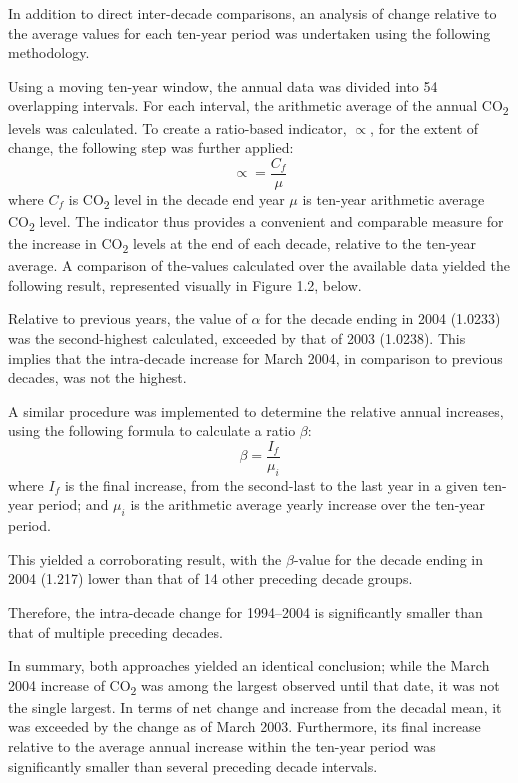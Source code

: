 \documentclass[12pt]{mcmthesis}
\newcommand{\size}[2]{{\fontsize{#1}{0}\selectfont#2}}
\begin{document}
    \noindent\size{12}{\textbf{Comparing to moving averages}}

    In addition to direct inter-decade comparisons, an analysis of change relative to the average values for each ten-year period was undertaken using the following methodology.

    Using a moving ten-year window, the annual data was divided into 54 overlapping intervals.
    For each interval, the arithmetic average of the annual CO\textsubscript{2} levels was calculated.
    To create a ratio-based indicator, $\propto$, for the extent of change, the following step was further applied:
%
    \begin{equation}
        \propto = \frac{C_f}{\mu}
    \end{equation}
%
    where
    $C_f$ is CO\textsubscript{2} level in the decade end year
    $\mu$ is ten-year arithmetic average CO\textsubscript{2} level.
    The indicator thus provides a convenient and comparable measure for the increase in CO\textsubscript{2} levels at the end of each decade, relative to the ten-year average. A comparison of the-values calculated over the available data yielded the following result, represented visually in Figure 1.2, below.


    Relative to previous years, the value of $\alpha$ for the decade ending in 2004 (1.0233) was the second-highest calculated, exceeded by that of 2003 (1.0238). This implies that the intra-decade increase for March 2004, in comparison to previous decades, was not the highest.

    A similar procedure was implemented to determine the relative annual increases, using the following formula to calculate a ratio $\beta$:
%
    \begin{equation}
        \beta = \frac{I_f}{\mu_i}
    \end{equation}
%
    where $I_f$ is the final increase, from the second-last to the last year in a given ten-year period; and
    $\mu_i$ is the arithmetic average yearly increase over the ten-year period.

    This yielded a corroborating result, with the $\beta$-value for the decade ending in 2004 (1.217) lower than that of 14 other preceding decade groups.

    Therefore, the intra-decade change for 1994--2004 is significantly smaller than that of multiple preceding decades.



    In summary, both approaches yielded an identical conclusion; while the March 2004 increase of CO\textsubscript{2} was among the largest observed until that date, it was not the single largest. In terms of net change and increase from the decadal mean, it was exceeded by the change as of March 2003. Furthermore, its final increase relative to the average annual increase within the ten-year period was significantly smaller than several preceding decade intervals.
\end{document}
